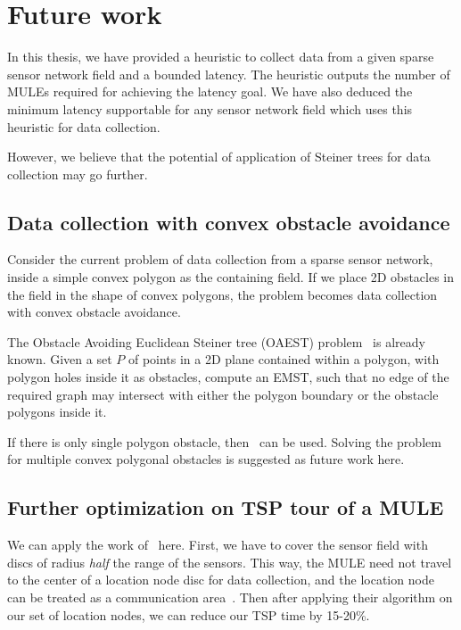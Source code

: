 \chapter{Future work}
\label{chap:concl}

In this thesis, we have provided a heuristic to collect data from a given sparse sensor network field and a bounded latency. The heuristic outputs the number of MULEs required for achieving the latency goal. We have also deduced the minimum latency supportable for any sensor network field which uses this heuristic for data collection.

However, we believe that the potential of application of Steiner trees for data collection may go further.

\section{Data collection with convex obstacle avoidance}

Consider the current problem of data collection from a sparse sensor network, inside a simple convex polygon as the containing field. If we place 2D obstacles in the field in the shape of convex polygons, the problem becomes data collection with convex obstacle avoidance.

The Obstacle Avoiding Euclidean Steiner tree (OAEST) problem~\cite{oaest99} is already known. Given a set $P$ of points in a 2D plane contained within a polygon, with polygon holes inside it as obstacles, compute an EMST, such that no edge of the required graph may intersect with either the polygon boundary or the obstacle polygons inside it.

If there is only single polygon obstacle, then~\cite{oatsp} can be used. Solving the problem for multiple convex polygonal obstacles is suggested as future work here.

\section{Further optimization on TSP tour of a MULE}

We can apply the work of~\cite{conHull} here. First, we have to cover the sensor field with discs of radius \emph{half} the range of the sensors. This way, the MULE need not travel to the center of a location node disc for data collection, and the location node can be treated as a communication area~\cite{conHull}. Then after applying their algorithm on our set of location nodes, we can reduce our TSP time by 15-20\%.

